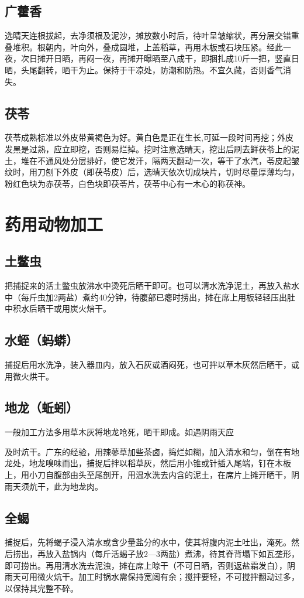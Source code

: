 \documentclass{ctexbook}
\begin{document}
\subsection{广藿香}
选晴天连根拔起，去净须根及泥沙，摊放数小时后，待叶呈皱缩状，再分层交错重叠堆积。根朝内，叶向外，叠成圆堆，上盖稻草，再用木板或石块压紧。经此一夜，次日摊开日晒，再闷一夜，再摊开曝晒至八成干，即捆扎成10斤一把，竖直日晒，头尾翻转，晒干为止。保持于干凉处，防潮和防热。不宜久藏，否则香气消失。

\subsection{茯苓}
茯苓成熟标准以外皮带黄褐色为好。黄白色是正在生长,可延一段时间再挖；外皮发黑是过熟，应立即挖，否则易烂掉。挖时注意选晴天，挖出后刷去鲜茯苓上的泥土，堆在不通风处分层排好，使它发汗，隔两天翻动一次，等干了水汽，苓皮起皱纹时，用刀刨下外皮（即茯苓皮）后，选晴天依次切成块片，切时尽量厚薄均匀，粉红色块为赤茯苓，白色块即茯苓片，茯苓中心有一木心的称茯神。
\section{药用动物加工}
\subsection{土鳖虫}
把捕捉来的活土鳖虫放沸水中烫死后晒干即可。也可以清水洗净泥土，再放入盐水中（每斤虫加2两盐）煮约40分钟，待腹部已瘪时捞出，摊在席上用板轻轻压出肚中积水后晒干或用炭火焙干。
\subsection{水蛭（蚂蟒）}
捕捉后用水洗净，装入器皿内，放入石灰或酒闷死，也可拌以草木灰然后晒干，或用微火烘干。
\subsection{地龙（蚯蚓）}
一般加工方法多用草木灰将地龙呛死，晒干即成。如遇阴雨天应

及时炕干。广东的经验，用辣蓼草加些茶卤，捣烂如糊，加入清水和匀，倒在有地龙处，地龙嗅味而出，捕捉后拌以稻草灰，然后用小锥或针插入尾端，钉在木板上，用小刀自腹部由头至尾剖开，用温水洗去内含的泥土，在席片上摊开晒干，阴雨天须炕干，此为地龙肉。
\subsection{全蝎}
捕捉后，先将蝎子浸入清水或含少量盐分的水中，使其将腹内泥土吐出，淹死。然后捞出，再放入盐锅内（每斤活蝎子放2—3两盐）煮沸，待其脊背塌下如瓦垄形，即可捞出。再用清水洗去泥浊，摊在席上晾干（不可日晒，否则返盐霜发白），阴雨天可用微火炕干。加工时锅水需保持宽阔有余；搅拌要轻，不可搅拌翻动过多，以保持其完整不碎。
\end{document}
